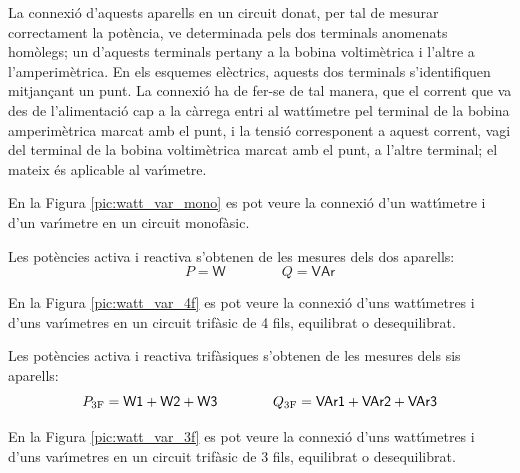 La connexi\'{o} d'aquests aparells en un circuit donat, per tal de
mesurar correctament la pot\`{e}ncia, ve determinada pels dos terminals
anomenats hom\`{o}legs; un d'aquests terminals pertany a la bobina
voltim\`{e}trica i l'altre a l'amperim\`{e}trica. En els esquemes el\`{e}ctrics,
aquests dos terminals s'identifiquen mitjan\c{c}ant un punt. La connexi\'{o}
ha de fer-se de tal manera, que el corrent que va des de
l'alimentaci\'{o} cap a la c\`{a}rrega entri al watt\'{\i}metre pel terminal de
la bobina amperim\`{e}trica marcat amb el punt, i la tensi\'{o} corresponent
a aquest corrent, vagi del terminal de la bobina voltim\`{e}trica marcat
amb el punt, a l'altre terminal; el mateix \'{e}s aplicable al
var\'{\i}metre.

En la Figura \vref{pic:watt_var_mono} es pot veure la connexi\'{o} d'un
watt\'{\i}metre i d'un var\'{\i}metre en un circuit monof\`{a}sic.


\begin{center}
    
    \label{pic:watt_var_mono}
\end{center}

Les pot\`{e}ncies activa i reactiva s'obtenen de les mesures dels dos
aparells:
\begin{equation}
    P = \textsf{W} \qquad\qquad Q = \textsf{VAr}
\end{equation}

En la Figura \vref{pic:watt_var_4f} es pot veure la connexi\'{o} d'uns
watt\'{\i}metres i d'uns var\'{\i}metres en un circuit trif\`{a}sic de 4 fils,
equilibrat o desequilibrat.

\begin{center}
    
    \label{pic:watt_var_4f}
\end{center}

Les pot\`{e}ncies activa i reactiva trif\`{a}siques s'obtenen de les mesures
dels sis aparells:
\begin{equation}
    P_\mathrm{3F} = \textsf{W1} +  \textsf{W2} + \textsf{W3}
    \qquad\qquad Q_\mathrm{3F} = \textsf{VAr1} +  \textsf{VAr2} + \textsf{VAr3}
\end{equation}

En la Figura \vref{pic:watt_var_3f} es pot veure la connexi\'{o} d'uns
watt\'{\i}metres i d'uns var\'{\i}metres en un circuit trif\`{a}sic de 3 fils,
equilibrat o desequilibrat.

